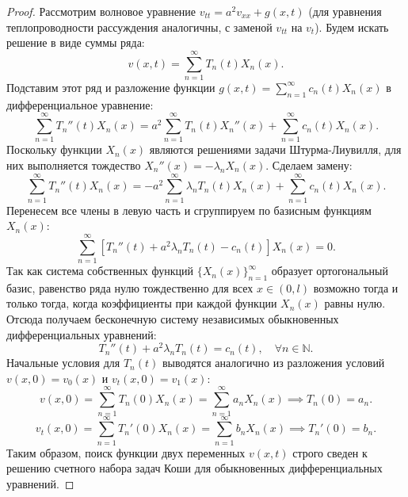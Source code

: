 \documentclass[a4paper,10pt]{article}
\begin{document}
\begin{proof}
Рассмотрим волновое уравнение $v_{tt} = a^2 v_{xx} + g(x,t)$ (для уравнения теплопроводности рассуждения аналогичны, с заменой $v_{tt}$ на $v_t$). Будем искать решение в виде суммы ряда:
\[ v(x,t) = \sum_{n=1}^\infty T_n(t) X_n(x). \]
Подставим этот ряд и разложение функции $g(x,t) = \sum_{n=1}^\infty c_n(t) X_n(x)$ в дифференциальное уравнение:
\[ \sum_{n=1}^\infty T_n''(t) X_n(x) = a^2 \sum_{n=1}^\infty T_n(t) X_n''(x) + \sum_{n=1}^\infty c_n(t) X_n(x). \]
Поскольку функции $X_n(x)$ являются решениями задачи Штурма-Лиувилля, для них выполняется тождество $X_n''(x) = -\lambda_n X_n(x)$. Сделаем замену:
\[ \sum_{n=1}^\infty T_n''(t) X_n(x) = - a^2 \sum_{n=1}^\infty \lambda_n T_n(t) X_n(x) + \sum_{n=1}^\infty c_n(t) X_n(x). \]
Перенесем все члены в левую часть и сгруппируем по базисным функциям $X_n(x)$:
\[ \sum_{n=1}^\infty \left[ T_n''(t) + a^2 \lambda_n T_n(t) - c_n(t) \right] X_n(x) = 0. \]
Так как система собственных функций $\{X_n(x)\}_{n=1}^\infty$ образует ортогональный базис, равенство ряда нулю тождественно для всех $x \in (0,l)$ возможно тогда и только тогда, когда коэффициенты при каждой функции $X_n(x)$ равны нулю. Отсюда получаем бесконечную систему независимых обыкновенных дифференциальных уравнений:
\[ T_n''(t) + a^2 \lambda_n T_n(t) = c_n(t), \quad \forall n \in \mathbb{N}. \]
Начальные условия для $T_n(t)$ выводятся аналогично из разложения условий $v(x,0) = v_0(x)$ и $v_t(x,0) = v_1(x)$:
\[ v(x,0) = \sum_{n=1}^\infty T_n(0) X_n(x) = \sum_{n=1}^\infty a_n X_n(x) \implies T_n(0) = a_n. \]
\[ v_t(x,0) = \sum_{n=1}^\infty T_n'(0) X_n(x) = \sum_{n=1}^\infty b_n X_n(x) \implies T_n'(0) = b_n. \]
Таким образом, поиск функции двух переменных $v(x,t)$ строго сведен к решению счетного набора задач Коши для обыкновенных дифференциальных уравнений.
\end{proof}
\end{document}
